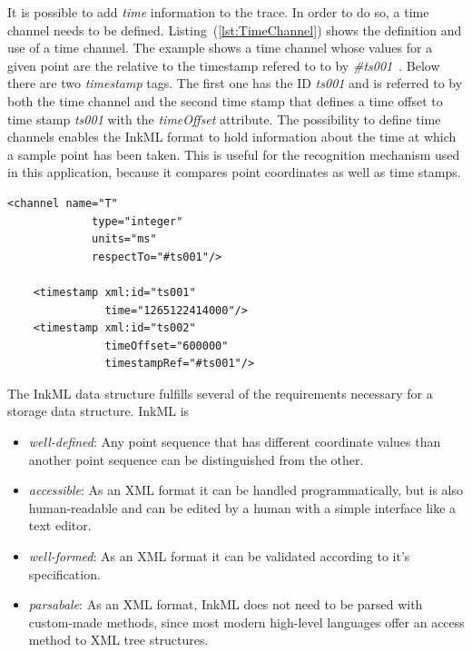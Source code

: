 It is possible to add \emph{time} information to the trace. In order to do so,
a time channel needs to be defined. Listing~(\ref{lst:TimeChannel}) shows the 
definition and use of a time channel. The example shows a time channel whose 
values for a given point are the relative to the timestamp refered to to by 
\emph{\#ts001}~. Below there are two \emph{timestamp} tags.
The first one has the ID \emph{ts001} and is referred to by both the
time channel and the second time stamp that defines a time offset to time stamp
\emph{ts001} with the \emph{timeOffset} attribute.
The possibility to define time channels enables the InkML format to hold 
information about the time at which a sample point has been taken.
This is useful for the recognition mechanism used in this application,
because it compares point coordinates as well as time stamps.
\begin{xmlcode}
  \begin{lstlisting}[emph={timestamp,channel},
                     emphstyle=\color{blue}\textbf,
                     emph={[2]name,type,units,respectTo,time,
                              timeOffset,timestampRef},
                     emphstyle={[2]\color{red}},
                     caption={Demonstration of the \emph{time channel}},
                     label=lst:TimeChannel]
    <channel name="T" 
             type="integer"
             units="ms"
             respectTo="#ts001"/>

    <timestamp xml:id="ts001" 
               time="1265122414000"/>
    <timestamp xml:id="ts002" 
               timeOffset="600000" 
               timestampRef="#ts001"/>
  \end{lstlisting}
\end{xmlcode}
The InkML data structure fulfills several of the requirements necessary for a 
storage data structure. InkML is 
\begin{itemize}
  \item \emph{well-defined}: Any point sequence that has different coordinate
        values than another point sequence can be distinguished from the other.
        
  \item \emph{accessible}: As an XML format it can be handled programmatically,
        but is also human-readable and can be edited by a human with a simple
        interface like a text editor.

  \item \emph{well-formed}: As an XML format it can be validated according to 
        it's specification.

  \item \emph{parsabale}: As an XML format, InkML does not need to be parsed with
        custom-made methods, since most modern high-level languages offer
        an access method to XML tree structures.
\end{itemize}
